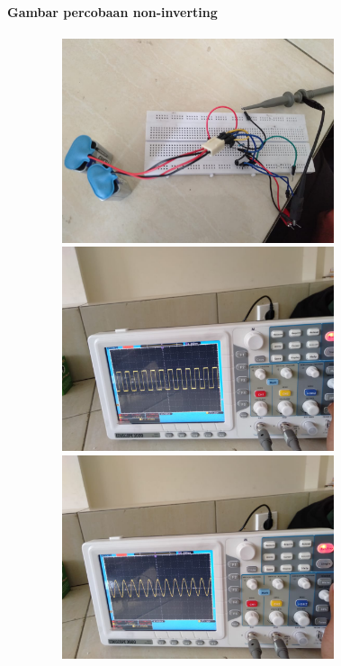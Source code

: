 \documentclass[12pt,a4paper]{article}
\begin{document}
\newpage
\begin{figure}
\paragraph{Gambar percobaan non-inverting}
\paragraph{ }
\begin{center}

\includegraphics[width=12cm, height=6cm]{Integrator1.png}

\includegraphics[width=12cm, height=6cm]{Integrator2.png}

\includegraphics[width=12cm, height=6cm]{Integrator3.png}

\end{center}
\end{figure}
\vspace{2cm}
\end{document}
